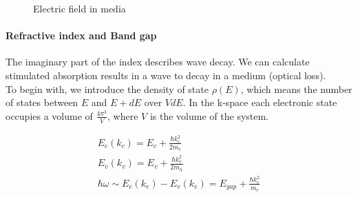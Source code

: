 \documentclass{article}
\begin{document}
		\begin{figure} 
			\centering 
	
			\caption{Electric field in media} \label{fig:subfig} %
		\end{figure}

		\paragraph{Refractive index and Band gap}

			The imaginary part of the index describes wave decay. We can calculate stimulated absorption results in a wave to decay in a medium (optical loss).\\

			To begin with, we introduce the density of state $\rho(E)$, which means the number of states between $E$ and $E + dE$ over $VdE$. In the k-space each electronic state occupies a volume of $\frac{4\pi^{3}}{V}$, where $V$ is the volume of the system.

			\begin{equation}
			\begin{aligned}
				E_{c}(k_{c}) = E_{c} + \frac{\hbar k_{c}^{2}}{2m_{e}}\\
				E_{v}(k_{v}) = E_{v} + \frac{\hbar k_{v}^{2}}{2m_{h}}\\
				\hbar\omega \sim E_{c}(k_{e}) - E_{v}(k_{e}) = E_{gap} + \frac{\hbar k_{e}^{2}}{m_{e}}
			\end{aligned}
			\end{equation}
\end{document}
